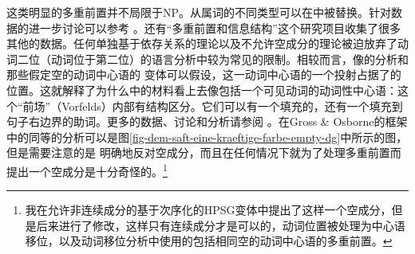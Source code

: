 这类明显的多重前置并不局限于NP。从属词的不同类型可以在\vfc 中被替换。针对数据的进一步讨论可以参考 。还有“多重前置和信息结构”这个研究项目收集了很多其他的数据\citep{Bildhauer2011a}。任何单独基于依存关系的理论以及不允许空成分的理论被迫放弃了动词二位（动词位于第二位）的语言分析中较为常见的限制。相较而言，像\gbc 的分析和那些假定空的动词中心语的\hpsgc
变体可以假设，这一动词中心语的一个投射占据了\vfc 的位置。这就解释了为什么\vfc 中的材料看上去像包括一个可见动词的动词性中心语：这个“前场”（Vorfelds）内部有结构区分。它们可以有一个填充的\nf，还有一个填充到句子右边界的助词。更多的数据、讨论和分析请参阅 。在Gross \& Osborne的框架\citeyearpar{GO2009a}中的同等的分析可以是图\vref{fig-dem-saft-eine-kraeftige-farbe-empty-dg}中所示的图，但是需要注意的是 \citet[]{GO2009a}明确地反对空成分，而且在任何情况下就为了处理多重前置而提出一个空成分是十分奇怪的。\footnote{%
我在允许非连续成分的基于次序化的HPSG变体中提出了这样一个空成分\citep{Mueller2002c}，但是后来进行了修改，这样只有连续成分才是可以的，动词位置被处理为中心语移位，以及动词移位分析中使用的包括相同空的动词中心语的多重前置\citep{Mueller2005d,MuellerGS}。
}
